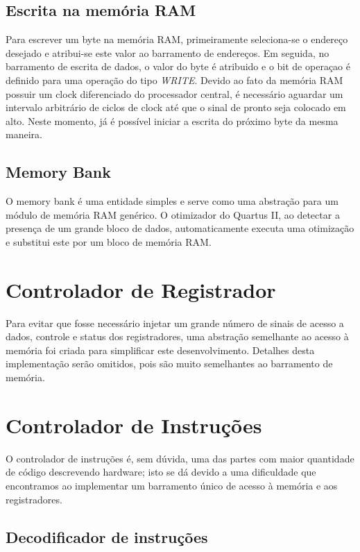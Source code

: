 \documentclass[11pt]{report}
\begin{document}
\subsection{Escrita na memória RAM}
Para escrever um byte na memória RAM, primeiramente seleciona-se o endereço desejado e atribui-se este valor ao barramento de endereços. Em seguida, no barramento de escrita de dados, o valor do byte é atribuido e o bit de operaçao é definido para uma operação do tipo \emph{WRITE}. Devido ao fato da memória RAM possuir um clock diferenciado do processador central, é necessário aguardar um intervalo arbitrário de ciclos de clock até que o sinal de pronto seja colocado em alto. Neste momento, já é possível iniciar a escrita do próximo byte da mesma maneira.

\subsection{Memory Bank}
\label{sec:MemoryBank}
O memory bank é uma entidade simples e serve como uma abstração para um módulo de memória RAM genérico. O otimizador do Quartus II, ao detectar a presença de um grande bloco de dados, automaticamente executa uma otimização e substitui este por um bloco de memória RAM.

\section{Controlador de Registrador}
Para evitar que fosse necessário injetar um grande número de sinais de acesso a dados, controle e status dos registradores, uma abstração semelhante ao acesso à memória foi criada para simplificar este desenvolvimento. Detalhes desta implementação serão omitidos, pois são muito semelhantes ao barramento de memória.

\section{Controlador de Instruções}
\label{sec:InstructionController}
O controlador de instruções é, sem dúvida, uma das partes com maior quantidade de código descrevendo hardware; isto se dá devido a uma dificuldade que encontramos ao implementar um barramento único de acesso à memória e aos registradores.

\subsection{Decodificador de instruções}
\end{document}
